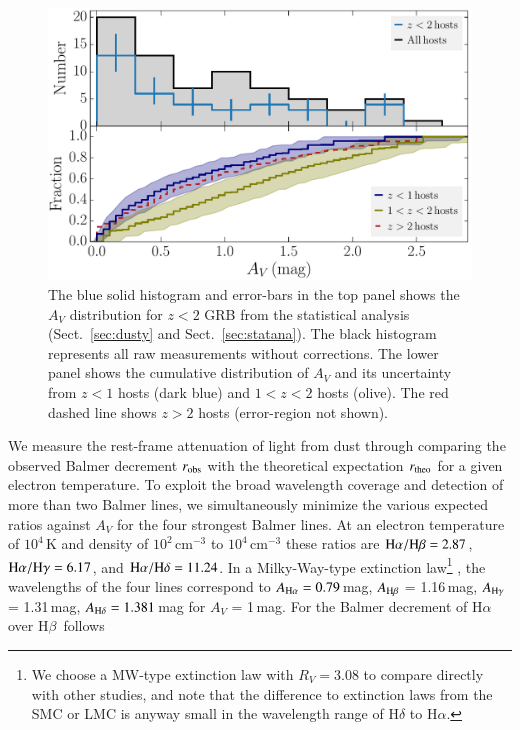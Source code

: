 \documentclass[traditabstract, longauth]{aa}
\newcommand{\hb}{H$\beta$}
\newcommand{\ha}{H$\alpha$}
\begin{document}
\begin{figure}
\includegraphics[angle=0, width=0.99\columnwidth]{Figs/EBV_histogram.pdf}
\caption{The blue solid histogram and error-bars in the top panel shows the $A_V$ distribution for $z < 2$ GRB from the statistical analysis (Sect.~\ref{sec:dusty} and Sect.~\ref{sec:statana}). The black histogram represents all raw measurements without corrections. The lower panel shows the cumulative distribution of $A_V$ and its uncertainty from $z<1$ hosts (dark blue) and $1<z<2$ hosts (olive). The red dashed line shows $z>2$ hosts (error-region not shown).}
\label{fig:ebvhist}
\end{figure}

We measure the rest-frame attenuation of light from dust through comparing the observed Balmer decrement $r_{\rm{obs}}$ with the theoretical expectation $r_{\rm{theo}}$ for a given electron temperature. To exploit the broad wavelength coverage and detection of more than two Balmer lines, we simultaneously minimize the various expected ratios against $A_V$ for the four strongest Balmer lines. At an electron temperature of $10^4$\,K and density of $10^{2}$\,cm$^{-3}$ to $10^{4}$\,cm$^{-3}$ these ratios are \citep{1989agna.book.....O} $\rm{H}\alpha/\rm{H}\beta = 2.87$, $\rm{H}\alpha/\rm{H}\gamma = 6.17$, and $\rm{H}\alpha/\rm{H}\delta = 11.24$. In a Milky-Way-type extinction law\footnote{We choose a MW-type extinction law with $R_V=3.08$ to compare directly with other studies, and note that the difference to extinction laws from the SMC or LMC is anyway small in the wavelength range of H$\delta$ to H$\alpha$.} \citep[][]{1992ApJ...395..130P}, the wavelengths of the four lines correspond to $A_{\rm{H}\alpha} = 0.79$\,mag, $A_{\rm{H}\beta}$ = 1.16\,mag, $A_{\rm{H}\gamma}$ = 1.31\,mag, $A_{\rm{H}\delta} = 1.381$\,mag for $A_V$ = 1\,mag. For the Balmer decrement of \ha\, over \hb\, follows
\end{document}
